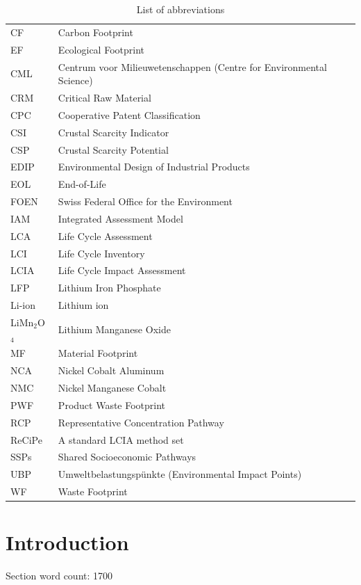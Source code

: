 \documentclass[review,3p,authoryear]{elsarticle}
\newcommand{\cbox}[1]{
    \begin{tcolorbox}[hbox, colback=red!5!white, colframe=red!65!black, boxrule=0.25pt, boxsep=2pt, left=2pt, right=2pt, top=1pt, bottom=1pt]
        \small\sffamily #1
    \end{tcolorbox}
}
\begin{document}
\begin{table}[H]
    \centering
    \caption{List of abbreviations}
    \label{tab:abbreviations}
    \begin{tabular}{ll}
    \toprule
    CF & Carbon Footprint \\
    EF & Ecological Footprint \\
    CML & Centrum voor Milieuwetenschappen (Centre for Environmental Science) \\
    CRM & Critical Raw Material \\
    CPC & Cooperative Patent Classification \\
    CSI & Crustal Scarcity Indicator \\
    CSP & Crustal Scarcity Potential \\
    EDIP & Environmental Design of Industrial Products \\
    EOL & End-of-Life \\
    FOEN & Swiss Federal Office for the Environment \\
    IAM & Integrated Assessment Model \\
    LCA & Life Cycle Assessment \\
    LCI & Life Cycle Inventory \\
    LCIA & Life Cycle Impact Assessment \\
    LFP & Lithium Iron Phosphate \\
    Li-ion & Lithium ion \\
    LiMn$_2$O$_4$ & Lithium Manganese Oxide \\
    MF & Material Footprint \\
    NCA & Nickel Cobalt Aluminum \\
    NMC & Nickel Manganese Cobalt \\
    PWF & Product Waste Footprint \\
    RCP & Representative Concentration Pathway \\
    ReCiPe & A standard LCIA method set \\
    SSPs & Shared Socioeconomic Pathways \\
    UBP & Umweltbelastungspünkte (Environmental Impact Points) \\
    WF & Waste Footprint \\
    \bottomrule
    \end{tabular}
    \end{table}

\section{Introduction}
\label{sec:introduction}
\cbox{Section word count: 1700}

\end{document}
